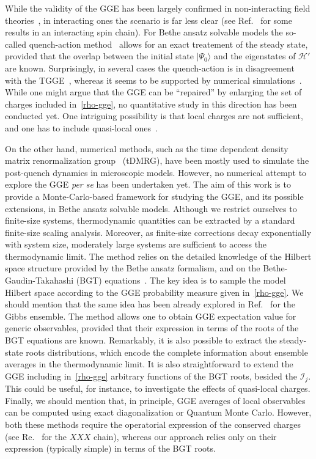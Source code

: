 \documentclass[twocolumn,superscriptaddress,prb,10pt]{revtex4-1}
\begin{document}
While the validity of the GGE has been largely confirmed in non-interacting field 
theories~\cite{calabrese-2011,calabrese-2012,fagotti-2013}, in interacting ones the 
scenario is far less clear (see Ref.~ for some results in an 
interacting spin chain). For Bethe ansatz solvable models the so-called quench-action 
method~\cite{caux-2013} allows for an exact treatement of the steady state, 
provided that the overlap between the initial state $|\Psi_0\rangle$ and the eigenstates 
of ${\mathcal H}'$ are known. Surprisingly, in several cases the quench-action is in 
disagreement with the TGGE~\cite{de-nardis-2014,pozsgay-2014,wouters-2014,mestyian-2015}, whereas it seems to be supported by numerical 
simulations~\cite{pozsgay-2014}. While one might argue that the GGE can be ``repaired'' 
by enlarging the set of charges included in~\eqref{rho-gge}, no quantitative study 
in this direction has been conducted yet. One intriguing 
possibility is that local charges are not sufficient, and one has to include 
quasi-local ones~\cite{prosen-2014,pereira-2014,ilievski-2015}. 

On the other hand, numerical methods, such as the time dependent density 
matrix renormalization group~\cite{white-2004,daley-2004} (tDMRG), have been mostly 
used to simulate the post-quench dynamics in microscopic models. However, no numerical 
attempt to explore the GGE {\it per se} has been undertaken yet. The aim of this work is to 
provide a Monte-Carlo-based framework for studying the GGE, and its possible extensions,   
in Bethe ansatz solvable models. Although we restrict ourselves to finite-size systems, 
thermodynamic quantities can be extracted by a standard finite-size scaling analysis. 
Moreover, as finite-size corrections decay exponentially with system size, moderately 
large systems are sufficient to access the thermodynamic limit. 
The method relies on the detailed knowledge of the Hilbert space structure provided by 
the Bethe ansatz formalism, and on the Bethe-Gaudin-Takahashi (BGT) equations~\cite{takahashi-1971,
taka-book}. The key idea is to sample the model Hilbert space according to 
the GGE probability measure given in~\eqref{rho-gge}. We should mention that the same idea 
has been already explored in Ref.~ for the Gibbs ensemble.
The method allows one to obtain GGE expectation value for generic observables, provided 
that their expression in terms of the roots of the BGT equations are known. Remarkably, 
it is also possible to extract the steady-state roots distributions, which encode 
the complete information about ensemble averages in the thermodynamic limit. It is also 
straightforward to extend  the GGE including in~\eqref{rho-gge} arbitrary functions of 
the BGT roots, besided the ${\mathcal I}_j$. This could be useful, for instance, to 
investigate the effects of quasi-local charges. Finally, we should mention that, in 
principle, GGE averages of local observables can be computed using exact diagonalization 
or Quantum Monte Carlo. However, both these methods require the operatorial expression of 
the conserved charges (see Re.~ for the $XXX$ chain), whereas 
our approach relies only on their expression (typically simple) in terms of the BGT roots. 
\end{document}
